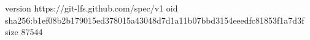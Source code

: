 version https://git-lfs.github.com/spec/v1
oid sha256:b1ef08b2b179015ed378015a43048d7d1a11b07bbd3154eeedfc81853f1a7d3f
size 87544
